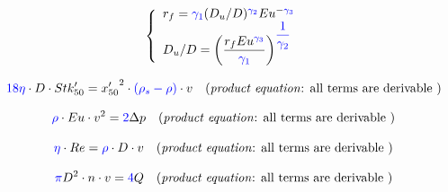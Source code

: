 \documentclass[12pt,reqno,intlimits,twoside]{amsart}
\begin{document}
\begin{equation}\label{EqRfDuDEu} %
   \left\{
   \begin{array}{l}
      r_f = \textcolor{blue}{\gamma_1} (D_u/D)^{\textcolor{blue}{\gamma_2}} Eu^{-\textcolor{blue}{\gamma_3}}\\
      D_u/D = \left(\dfrac{r_f Eu^{\textcolor{blue}{\gamma_3}}}{\textcolor{blue}{\gamma_1}}\right)^{\textcolor{blue}{\dfrac{1}{\gamma_2}}}
   \end{array}
   \right.
\end{equation}

\begin{equation}\label{EqStkDXRed50v} %
   \textcolor{blue}{18 \eta}\cdot D\cdot Stk'_{50} = {x'_{50}}^{2}\cdot\textcolor{blue}{(\rho_s - \rho)}\cdot v%
   \quad\text{(\emph{product equation}: all terms are derivable )}
\end{equation}

\begin{equation}\label{EqEuDpv} %
   \textcolor{blue}{\rho}\cdot Eu\cdot v^2 = \textcolor{blue}{2}\Delta p%
   \quad\text{(\emph{product equation}: all terms are derivable )}
\end{equation}

\begin{equation}\label{EqReDv} %
   \textcolor{blue}{\eta}\cdot Re = \textcolor{blue}{\rho}\cdot D\cdot v%
   \quad\text{(\emph{product equation}: all terms are derivable )}
\end{equation}

\begin{equation}\label{EqQvDn} %
   \textcolor{blue}{\pi} D^2\cdot n\cdot v = \textcolor{blue}{4} Q%
   \quad\text{(\emph{product equation}: all terms are derivable )}
\end{equation}
\end{document}
